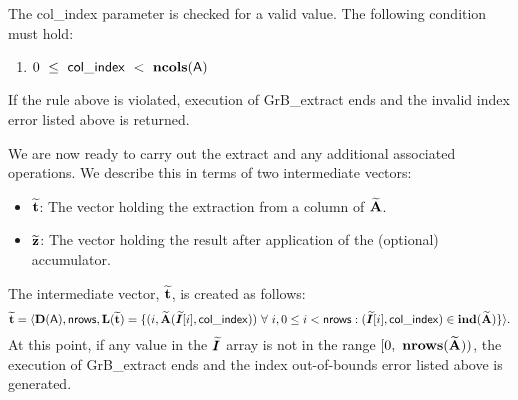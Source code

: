 The {\sf col\_index} parameter is checked for a valid value.  The following
condition must hold:
\begin{enumerate}
	\item $0\ \leq\ {\sf col\_index} \ <\ \bold{ncols}({\sf A})$
\end{enumerate}
If the rule above is violated, execution of {\sf GrB\_extract} ends 
and the invalid index error listed above is returned.

We are now ready to carry out the extract and any additional 
associated operations.  We describe this in terms of two intermediate vectors:
\begin{itemize}
	\item ${\bf \widetilde{t}}$: The vector holding the extraction from
    a column of ${\bf \widetilde{A}}$.
	\item ${\bf \widetilde{z}}$: The vector holding the result after 
    application of the (optional) accumulator.
\end{itemize}

The intermediate vector, ${\bf \widetilde{t}}$, is created as follows:
\[ 
{\bf \widetilde{t}} = \langle \bold{D}({\sf A}), {\sf nrows},
\bold{L}({\bf \widetilde{t}}) = 
\{(i,{\bf \widetilde{A}}(\bm{\widetilde{I}}[i],{\sf col\_index})) 
\ \forall\ i, 0 \leq i < {\sf nrows} : 
(\bm{\widetilde{I}}[i], {\sf col\_index}) \in 
\bold{ind}({\bf \widetilde{A}}) \} \rangle. 
\]
At this point, if any value in the $\bm{\widetilde{I}}$ array is not in
the range $[0,\ \bold{nrows}(\matrix{\widetilde{A}}) )$, the execution of 
{\sf GrB\_extract} ends and the index out-of-bounds error listed above is 
generated.  

